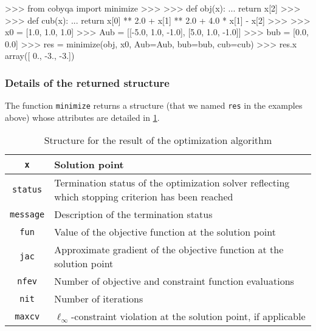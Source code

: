 \pagebreak

\begin{lstpython}[%
    caption=An example of \gls{cobyqa} with nonlinear constraints,
    label=lst:cobyqa-problem-g,
]
    >>> from cobyqa import minimize
    >>>
    >>> def obj(x):
    ...     return x[2]
    >>>
    >>> def cub(x):
    ...     return x[0] ** 2.0 + x[1] ** 2.0 + 4.0 * x[1] - x[2] 
    >>>
    >>> x0 = [1.0, 1.0, 1.0]
    >>> Aub = [[-5.0, 1.0, -1.0], [5.0, 1.0, -1.0]]
    >>> bub = [0.0, 0.0]
    >>> res = minimize(obj, x0, Aub=Aub, bub=bub, cub=cub)
    >>> res.x
    array([ 0., -3., -3.])   
\end{lstpython}

\subsubsection{Details of the returned structure}

The function \texttt{minimize} returns a structure (that we named \texttt{res} in the examples above) whose attributes are detailed in \cref{tab:optimize-result}.

\begin{table}[ht]
    \caption{Structure for the result of the optimization algorithm}
    \label{tab:optimize-result}
    \centering
    \begin{tabularx}{\textwidth}{cX}
        \toprule
        \texttt{x}          & Solution point\\
        \midrule
        \texttt{status}     & Termination status of the optimization solver reflecting which stopping criterion has been reached\\
        \midrule
        \texttt{message}    & Description of the termination status\\
        \midrule
        \texttt{fun}        & Value of the objective function at the solution point\\
        \midrule
        \texttt{jac}        & Approximate gradient of the objective function at the solution point\\
        \midrule
        \texttt{nfev}       & Number of objective and constraint function evaluations\\
        \midrule
        \texttt{nit}        & Number of iterations\\
        \midrule
        \texttt{maxcv}      & $\ell_{\infty}$-constraint violation at the solution point, if applicable\\
        \bottomrule
    \end{tabularx}
\end{table}

